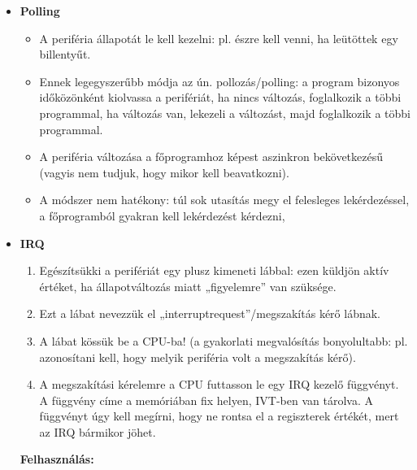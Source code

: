 \documentclass[11pt,a4paper]{article}
\begin{document}
            \begin{tcolorbox}[colback=blue!5!white,colframe=blue!50!black,title= 15. Ismertesse a periféria csatolási módszereket{,} módszerenként kitérve az adott módszer előnyére{,} és hátrányára! Part 1.]
                \begin{itemize}
                    \item \textbf{Polling}
                    \begin{itemize}
                        \item A periféria állapotát le kell kezelni: pl. észre kell venni, ha leütöttek egy billentyűt.
                        \item Ennek legegyszerűbb módja az ún. pollozás/polling: a program bizonyos időközönként kiolvassa a perifériát, ha nincs változás, foglalkozik a többi programmal, ha változás van, lekezeli a változást, majd foglalkozik a többi programmal.
                        \item A periféria változása a főprogramhoz képest aszinkron bekövetkezésű (vagyis nem tudjuk, hogy mikor kell beavatkozni).
                        \item A módszer nem hatékony: túl sok utasítás megy el felesleges lekérdezéssel, a főprogramból gyakran kell lekérdezést kérdezni,
                    \end{itemize}
                    \item \textbf{IRQ}
                    \begin{enumerate}
                        \item Egészítsükki a perifériát egy plusz kimeneti lábbal: ezen küldjön aktív értéket, ha állapotváltozás miatt „figyelemre” van szüksége.
                        \item Ezt a lábat nevezzük el „interruptrequest”/megszakítás kérő lábnak.
                        \item A lábat kössük be a CPU-ba! (a gyakorlati megvalósítás bonyolultabb: pl. azonosítani kell, hogy melyik
                        periféria volt a megszakítás kérő).
                        \item A megszakítási kérelemre a CPU futtasson le egy IRQ kezelő függvényt. A függvény címe a memóriában fix helyen, IVT-ben van tárolva. A függvényt úgy kell megírni, hogy ne rontsa el a regiszterek értékét, mert az IRQ bármikor jöhet.
                    \end{enumerate}
                    \textbf{Felhasználás:}
                    \begin{itemize}

\end{itemize}
\end{itemize}
\end{tcolorbox}
\end{document}
